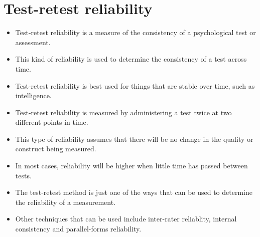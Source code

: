\section*{Test-retest reliability }

\begin{itemize}
\item Test-retest reliability is a measure of the consistency of a psychological test or assessment. 
\item This kind of reliability is used to determine the consistency of a test across time. 
\item Test-retest reliability is best used for things that are stable over time, such as intelligence.
\item Test-retest reliability is measured by administering a test twice at two different points in time.
\item This type of reliability assumes that there will be no change in the quality or construct being measured.
\item In most cases, reliability will be higher when little time has passed between tests.
\item The test-retest method is just one of the ways that can be used to determine the reliability of a measurement. 
\item Other techniques that can be used include inter-rater reliablity, internal consistency and parallel-forms reliability.
\end{itemize}


